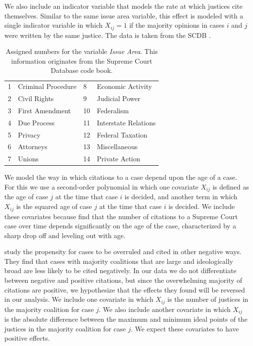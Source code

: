 \documentclass[headsepline=true, abstracton]{scrartcl}
\begin{document}
We also include an indicator variable that models the rate at which justices cite themselves. Similar to the same issue area variable, this effect is modeled with a single indicator variable in which $X_{ij} = 1$ if the majority opinions in cases $i$ and $j$ were written by the same justice. The data is taken from the SCDB \citep{spaeth2014supreme}. 


\begin{table}[bt]

	\label{issue_area_coding}
	\centering
	\begin{tabular}{llll}
		1 & Criminal Procedure & 8  & Economic Activity    \\
		2 & Civil Rights       & 9  & Judicial Power       \\
		3 & First Amendment    & 10 & Federalism           \\
		4 & Due Process        & 11 & Interstate Relations \\
		5 & Privacy            & 12 & Federal Taxation     \\
		6 & Attorneys          & 13 & Miscellaneous        \\
		7 & Unions             & 14 & Private Action      
	\end{tabular}
	\caption{Assigned numbers for the variable \textit{Issue Area}. This information originates from the Supreme Court Database code book.}
\end{table}

We model the way in which citations to a case depend upon the age of a case. For this we use a second-order polynomial in which one covariate $X_{ij}$ is defined as the age of case $j$ at the time that case $i$ is decided, and another term in which $X_{ij}$ is the squared age of case $j$ at the time that case $i$ is decided. We include these covariates because \citet{black2013citation} find that the number of citations to a Supreme Court case over time depends significantly on the age of the case, characterized by a sharp drop off and leveling out with age. 

\citet{benjamin2012standing} study the propensity for cases to be overruled and cited in other negative ways. They find that cases with majority coalitions that are large and ideologically broad are less likely to be cited negatively. In our data we do not differentiate between negative and positive citations, but since the overwhelming majority of citations are positive, we hypothesize that the effects they found will be reversed in our analysis. We include one covariate in which $X_{ij}$ is the number of justices in the majority coalition for case $j$. We also include another covariate in which $X_{ij}$ is the absolute difference between the maximum and minimum ideal points of the justices in the majority coalition for case $j$. We expect these covariates to have positive effects.
\end{document}
